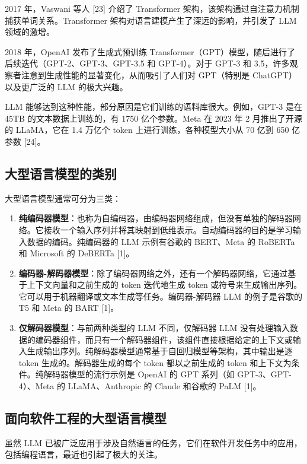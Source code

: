 \begin{translation}
2017 年，Vaswani 等人 [23] 介绍了 Transformer 架构，该架构通过自注意力机制捕获单词关系。Transformer 架构对语言建模产生了深远的影响，并引发了 LLM 领域的激增。

2018 年，OpenAI 发布了生成式预训练 Transformer（GPT）模型，随后进行了后续迭代（GPT-2、GPT-3、GPT-3.5 和 GPT-4）。对于 GPT-3 和 3.5，许多观察者注意到生成性能的显著变化，从而吸引了人们对 GPT（特别是 ChatGPT）以及更广泛的 LLM 的极大兴趣。

LLM 能够达到这种性能，部分原因是它们训练的语料库很大。例如，GPT-3 是在 45TB 的文本数据上训练的，有 1750 亿个参数。Meta 在 2023 年 2 月推出了开源的 LLaMA，它在 1.4 万亿个 token 上进行训练，各种模型大小从 70 亿到 650 亿参数 [24]。

\subsection{大型语言模型的类别}

大型语言模型通常可分为三类：
\begin{enumerate}
    \item \textbf{纯编码器模型}：也称为自编码器，由编码器网络组成，但没有单独的解码器网络。它接收一个输入序列并将其映射到低维表示。自动编码器的目的是学习输入数据的编码。纯编码器的 LLM 示例有谷歌的 BERT、Meta 的 RoBERTa 和 Microsoft 的 DeBERTa [1]。
    
    \item \textbf{编码器-解码器模型}：除了编码器网络之外，还有一个解码器网络，它通过基于上下文向量和之前生成的 token 迭代地生成 token 或符号来生成输出序列。它可以用于机器翻译或文本生成等任务。编码器-解码器 LLM 的例子是谷歌的 T5 和 Meta 的 BART [1]。
    
    \item \textbf{仅解码器模型}：与前两种类型的 LLM 不同，仅解码器 LLM 没有处理输入数据的编码器组件，而只有一个解码器组件，该组件直接根据给定的上下文或输入生成输出序列。纯解码器模型通常基于自回归模型等架构，其中输出是逐 token 生成的。解码器生成的每个 token 都以之前生成的 token 和上下文为条件。纯解码器模型的流行示例是 OpenAI 的 GPT 系列（如 GPT-3、GPT-4）、Meta 的 LLaMA、Anthropic 的 Claude 和谷歌的 PaLM [1]。
\end{enumerate}

\subsection{面向软件工程的大型语言模型}

虽然 LLM 已被广泛应用于涉及自然语言的任务，它们在软件开发任务中的应用，包括编程语言，最近也引起了极大的关注。


\end{translation}
